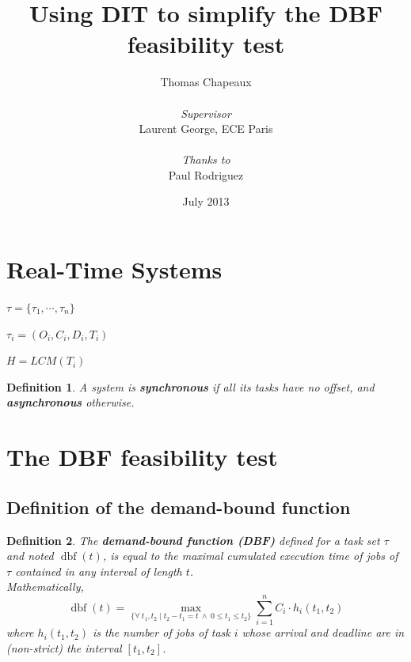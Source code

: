 \documentclass[a4paper,10pt]{article}
\newcommand{\dbf}[1]{\operatorname{dbf}(#1)}
\newtheorem{definition}{Definition}
\begin{document}
\title{Using DIT to simplify the DBF feasibility test}
\author{Thomas Chapeaux \\ ~ \\ \emph{Supervisor} \\ Laurent George, ECE Paris \\ ~ \\ \emph{Thanks to} \\ Paul Rodriguez}

\date{July 2013}

\maketitle

\tableofcontents

\newpage

\section{Real-Time Systems}

$\tau = \{ \tau_1, \cdots, \tau_n \}$

$\tau_i = (O_i, C_i, D_i, T_i)$

$H = LCM(T_i)$

\begin{definition}
	A system is \textbf{synchronous} if all its tasks have no offset, and
	\textbf{asynchronous} otherwise.
\end{definition}

\section{The DBF feasibility test}
\label{sct:DBF}

\subsection{Definition of the demand-bound function}

\begin{definition}
	The \textbf{demand-bound function (DBF)}
	\cite{baruah1999generalized, baruah1990algorithms} defined for a task set
	$\tau$ and noted $\dbf{t}$, is equal to the maximal cumulated execution time of jobs of $\tau$ contained in any interval of length $t$.\\

	Mathematically,
	\[
		\dbf{t} = \max_{\{\forall \: t_1, t_2 \mid t_2 - t_1 = t \: \wedge \: 0
		\leqslant t_1 \leqslant t_2\}} \sum_{i=1}^n C_i \cdot h_i(t_1, t_2)
	\]
	where $h_i(t_1, t_2)$ is the number of jobs of task $i$ whose arrival and
	deadline are in (non-strict) the interval $[t_1, t_2]$.
\end{definition}
\end{document}
